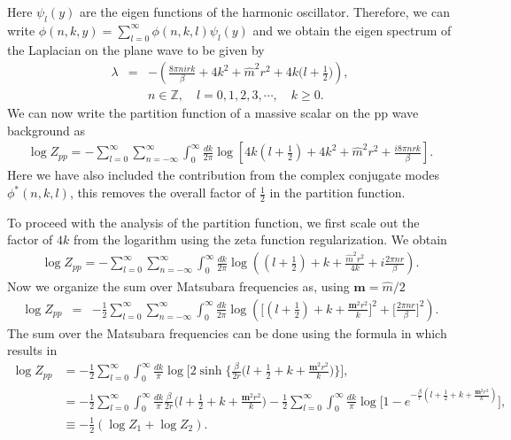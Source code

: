 \documentclass[a4paper,11pt]{article}
\begin{document}
Here $\psi_l(y)$ are the eigen functions of the harmonic oscillator. 
Therefore, we can write  $\phi(n, k , y) =\sum_{l =0}^\infty  \phi( n, k , l ) \psi_l(y)$  and we obtain the eigen spectrum of the
Laplacian on the plane wave to be given by 
\begin{eqnarray}
	\lambda &=& -\left( \frac{ 8\pi n i  r k }{  \beta}  +  4k^2  + \hat m^2 r^2  + 4k \big(l + \frac{1}{2} \big) \right) , 
	\\ \nonumber
	&& n \in \mathbb{Z},  \quad  l = 0, 1, 2, 3, \cdots , \quad  k \geq 0 .
\end{eqnarray}
We can now write the partition function of a massive scalar on the pp wave background as 
\begin{eqnarray}
	\log Z_{pp} =-  \sum_{l = 0}^\infty \sum_{n = -\infty}^\infty   \int_0^\infty \frac{dk}{2\pi} 
	\log\left[  4k  ( l + \frac{1}{2} )  + 4  k^2  +\hat m^2 r^2 + \frac{i 8\pi nr k }{\beta} \right].
\end{eqnarray}
Here we have also included the contribution from the complex conjugate  modes $\phi^*(n, k, l)$, this removes the  overall factor of 
$\frac{1}{2}$ in the partition function. 

To proceed with the analysis of the partition function, we first   scale out the factor of $4 k$ from the logarithm
using the zeta function regularization. 
We obtain 
\begin{eqnarray}
	\log Z_{pp} =- \sum_{l = 0}^\infty \sum_{n = -\infty}^\infty   \int_0^\infty \frac{dk}{2\pi} 
	\log\left({( l + \frac{1}{2} )} + k  +  \frac{\hat m^2r^2 }{4k}   +  i \frac{2\pi nr }{\beta}  \right) .
\end{eqnarray}
Now we organize the sum over Matsubara frequencies as, using $\mathbf{m}=\hat m/2$
\begin{eqnarray}\label{z0+z3}
	\log Z_{pp}  &=&- \frac{1}{2}\sum_{l = 0}^\infty \sum_{n = -\infty}^\infty   \int_0^\infty \frac{dk}{2\pi} 
	\log\left(  \Big[ {( l + \frac{1}{2} )}  + k  +  \frac{ \mathbf{m}^2r^2 }{k} \Big]^2    +  \Big[ \frac{2\pi nr }{\beta} \Big]^2   \right)  .
\end{eqnarray}
The sum over the Matsubara frequencies  can be done using the formula  in \cite{Klebanov:2011uf}  which results in 
\begin{align}\label{z1+z2}
	\log Z_{pp} &=-\frac12\sum_{l=0}^\infty \int_0^\infty \frac{dk}{\pi} \log \Big[2\sinh \Big\{\frac{\beta}{2r}\big(l+\frac{1}{2}+k+\frac{\mathbf m^2r^2}{k}\big)\Big\}\Big]\nonumber,\\
	&=-\frac12\sum_{l=0}^{\infty} \int_0^\infty \frac{dk}{\pi} \frac{\beta}{2r}\Big(l+\frac{1}{2}+k+\frac{\mathbf m^2r^2}{k}\Big)-\frac12\sum_{l=0}^{\infty} \int_0^\infty \frac{dk}{\pi}\log\Big[1-e^{-\frac{\beta}{r}(l+\frac{1}{2}+k+\frac{\mathbf m^2r^2}{k})}\Big]\nonumber,\\
	&\equiv- \frac12
	(\log Z_1+\log Z_2).
\end{align}
\end{document}
